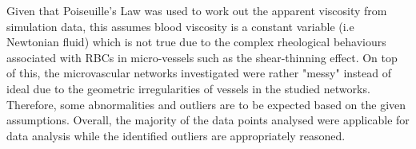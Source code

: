 \begin{table}[H]
\centering
\caption{\textit{List of branches with additional errors due to assumptions made}
\label{AdditionalErrors}}
\end{table}

\noindent Given that Poiseuille's Law was used to work out the apparent viscosity from simulation data, this assumes blood viscosity is a constant variable (i.e Newtonian fluid) which is not true due to the complex rheological behaviours associated with RBCs in micro-vessels such as the shear-thinning effect. On top of this, the microvascular networks investigated were rather "messy" instead of ideal due to the geometric irregularities of vessels in the studied networks. Therefore, some abnormalities and outliers are to be expected based on the given assumptions. Overall, the majority of the data points analysed were applicable for data analysis while the identified outliers are appropriately reasoned. \\
